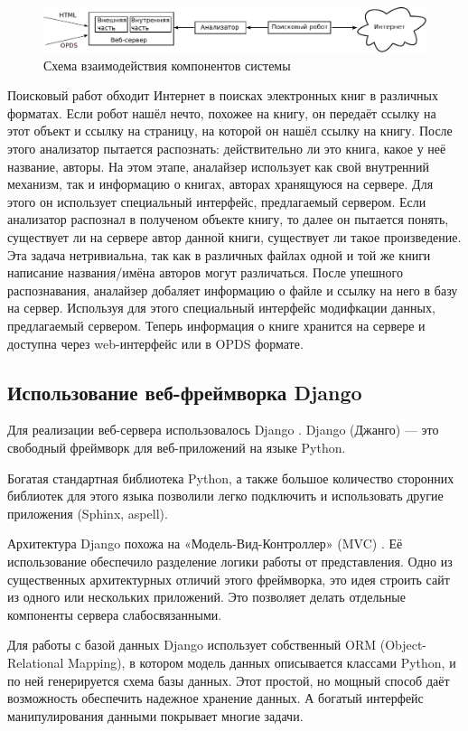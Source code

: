 \begin{figure}
\centering
\includegraphics[width=.9\textwidth]{./head/innerstructure}
\caption{Схема взаимодействия компонентов системы}\label{fig:innerstructure}
\end{figure}

Поисковый работ обходит Интернет в поисках электронных книг в различных форматах. Если робот нашёл нечто, похожее на книгу, он передаёт ссылку на этот объект и ссылку на страницу, на которой он нашёл ссылку на книгу.
После этого анализатор пытается распознать: действительно ли это книга, какое у неё название, авторы. На этом этапе, аналайзер использует как свой внутренний механизм, так и информацию о книгах, авторах хранящуюся на сервере. Для этого он использует специальный интерфейс, предлагаемый сервером.
Если анализатор распознал в полученом объекте книгу, то далее он пытается понять, существует ли на сервере автор данной книги, существует ли такое произведение. Эта задача нетривиальна, так как в различных файлах одной и той же книги написание названия/имёна авторов могут различаться.
После упешного распознавания, аналайзер добаляет информацию о файле и ссылку на него в базу на сервер. Используя для этого специальный интерфейс модифкации данных, предлагаемый сервером.
Теперь информация о книге хранится на сервере и доступна через web-интерфейс или в OPDS формате.



\subsection{Использование веб-фреймворка Django}

Для реализации веб-сервера использовалось Django \cite{django}.
Django (Джанго) — это свободный фреймворк для веб-приложений на языке Python.

Богатая стандартная библиотека Python, а также большое количество сторонних библиотек для этого языка
позволили легко подключить и использовать другие приложения (Sphinx, aspell).

Архитектура Django похожа на «Модель-Вид-Контроллер» (MVC) \cite{djangomvc}.
Её использование обеспечило разделение логики работы от представления. 
Одно из существенных архитектурных отличий этого фреймворка, 
это идея строить сайт из одного или нескольких приложений.
Это позволяет делать отдельные компоненты сервера слабосвязанными.

Для работы с базой данных Django использует собственный ORM (Object-Relational Mapping),
в котором модель данных описывается классами Python, и по ней генерируется схема базы данных.
Этот простой, но мощный способ даёт возможность обеспечить надежное хранение данных.
А богатый интерфейс манипулирования данными покрывает многие задачи.
